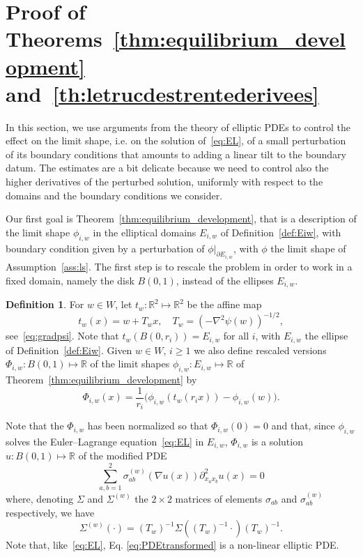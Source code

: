 \documentclass[10pt]{amsart}
\theoremstyle{definition}\newtheorem{defi}[theo]{Definition}\newtheorem{rema}[theo]{Remark}\newtheorem{exam}[theo]{Example}\newtheorem{exem}[theo]{Example}\newtheorem{nota}[theo]{Notation}
\newcommand{\R}{\mathbb{R}}
\begin{document}
\section{Proof of Theorems~\ref{thm:equilibrium_development} and~\ref{th:letrucdestrentederivees}}\label{sec:perturbation_continuum}

In this section, we use arguments from the theory of elliptic PDEs to control the effect on the limit shape, i.e. on the solution of~\eqref{eq:EL}, of a small perturbation of its boundary conditions that amounts to adding a linear tilt to the boundary datum. The estimates are a bit delicate because we need to control also the higher derivatives of the perturbed solution, uniformly with respect to the domains and the boundary conditions we consider.


Our first goal is Theorem~\ref{thm:equilibrium_development}, that is a description of the limit shape $\phi_{i,w}$ in the elliptical domains $E_{i,w}$ of Definition~\ref{def:Eiw}, with boundary condition given by a perturbation of $\phi|_{\partial E_{i,w}}$, with $\phi$ the limit shape of Assumption~\ref{ass:ls}. The first step is to rescale the problem in order to work in a fixed domain, namely the disk $B(0,1)$, instead of the ellipses $E_{i,w}$.
\begin{defi}
For $w \in W$, let $t_w:\R^2\mapsto \R^2$ be the affine map
\begin{equation}\label{eq:tw}
t_w(x)=w+T_w x, \quad T_w=\left(-\nabla^2\psi(w)\right)^{-1/2},
\end{equation}
see~\eqref{eq:gradpsi}. Note that $t_w(B(0, r_i)) = E_{i,w}$ for all $i$, with $E_{i,w}$ the ellipse of Definition~\ref{def:Eiw}. Given $w\in W$, $i\ge1$ we also define rescaled versions $\Phi_{i,w}:B(0, 1)\mapsto \R$ of the limit shapes $\phi_{i,w}:E_{i,w}\mapsto \R$ of Theorem~\ref{thm:equilibrium_development} by
\begin{equation}\label{eq:PhiIW}
\Phi_{i,w}(x) = \frac{1}{r_i}\big(\phi_{i,w}(t_w(r_i x)) - \phi_{i,w}(w)\big).
\end{equation}
\end{defi}

Note that the $\Phi_{i,w}$ has been normalized so that $\Phi_{i,w}(0)=0$ and that, since $\phi_{i,w}$ solves the Euler--Lagrange equation~\eqref{eq:EL} in $E_{i,w}$, $\Phi_{i,w}$ is a solution $u:B(0,1)\mapsto \R$ of the modified PDE
\begin{equation}\label{eq:PDEtransformed}
\sum_{a,b=1}^2\sigma^{(w)}_{ab}(\nabla u(x))\partial^2_{x_a x_b}u(x)=0
\end{equation}
where, denoting $\Sigma$ and $\Sigma^{(w)}$ the $2\times 2$ matrices of elements $\sigma_{ab}$ and $\sigma^{(w)}_{ab}$ respectively, we have
\begin{equation}\label{eq:sS}
\Sigma^{(w)}(\cdot)=(T_w)^{-1} \Sigma\left((T_w)^{-1}\cdot\right)(T_w)^{-1}.
\end{equation}
Note that, like~\eqref{eq:EL}, Eq. \eqref{eq:PDEtransformed} is a non-linear elliptic PDE.
\end{document}
